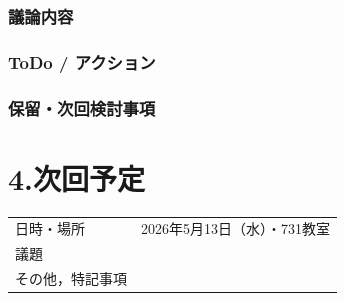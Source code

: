 \documentclass[a4paper,12pt]{ltjsarticle}
\begin{document}
\subsubsection*{議論内容}

\subsubsection*{ToDo / アクション}

\subsubsection*{保留・次回検討事項}

\section*{4.次回予定}
\begin{tabular}{ll}
  \toprule
  日時・場所 & 2026年5月13日（水）・731教室 \\
  議題       &  \\
  その他，特記事項 & \\
  \bottomrule
\end{tabular}
\end{document}
